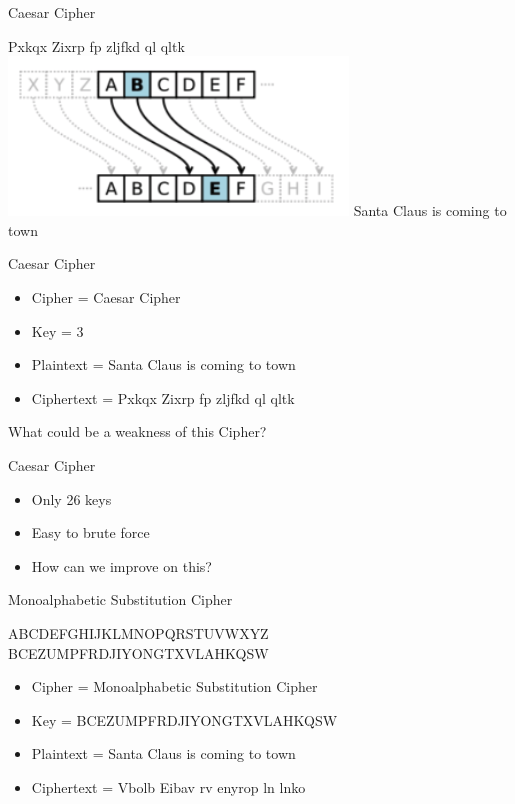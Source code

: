 \documentclass{beamer}
\begin{document}
\begin{frame}{Caesar Cipher}
\begin{center}
Pxkqx Zixrp fp zljfkd ql qltk \newline
\includegraphics[width=0.7\linewidth]{caesar-cipher.png} \newline
Santa Claus is coming to town
\end{center}
\end{frame}

\begin{frame}{Caesar Cipher}
\begin{itemize}
\item Cipher = Caesar Cipher
\item Key = 3
\item Plaintext = Santa Claus is coming to town
\item Ciphertext =  Pxkqx Zixrp fp zljfkd ql qltk
\end{itemize}
What could be a weakness of this Cipher?
\end{frame}

\begin{frame}{Caesar Cipher}
\begin{itemize}
\item Only 26 keys
\item Easy to brute force
\item How can we improve on this?
\end{itemize}
\end{frame}

\begin{frame}{Monoalphabetic Substitution Cipher}
\begin{center}
ABCDEFGHIJKLMNOPQRSTUVWXYZ
BCEZUMPFRDJIYONGTXVLAHKQSW
\end{center}
\begin{itemize}
\item Cipher = Monoalphabetic Substitution Cipher
\item Key = BCEZUMPFRDJIYONGTXVLAHKQSW
\item Plaintext = Santa Claus is coming to town
\item Ciphertext =  Vbolb Eibav rv enyrop ln lnko
\end{itemize}
\end{frame}
\end{document}

